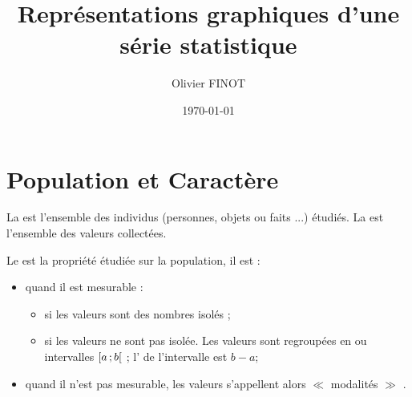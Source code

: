 \documentclass[12pt,a4paper]{article}
\author{Olivier FINOT}
\date{\today}
\title{Représentations graphiques d'une série statistique }
\begin{document}
\maketitle

\section{Population et Caractère}

\begin{pasbox}[style=defi ,degrade , pluriel, name=Population]
La  est l'ensemble des individus (personnes, objets ou faits ...) étudiés.
La  est l'ensemble des valeurs collectées.
\end{pasbox}

\begin{pasbox}[style=defi ,degrade , pluriel, name=Caractère]

Le  est la propriété étudiée sur la population, il est :
\begin{itemize}
	\item {} quand il est mesurable :
		\begin{itemize}
			\item {} si les valeurs sont des nombres isolés ;
			\item {} si les valeurs ne sont pas isolée. Les valeurs sont regroupées en  ou intervalles $\mbox{\ensuremath{\left[a\mathpunct{};b\right[}}$ ; l' de l'intervalle est $b -a$;
		\end{itemize}
	\item {} quand il n'est pas mesurable, les valeurs s'appellent alors $\ll$ modalités $\gg$ .
\end{itemize}
\end{pasbox}
\end{document}
